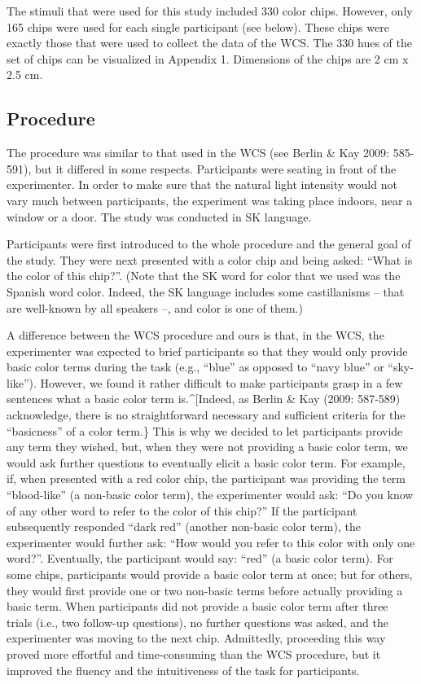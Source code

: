 \documentclass[man]{apa6}
\theoremstyle{definition}
\theoremstyle{definition}
\theoremstyle{definition}
\theoremstyle{remark}
\begin{document}
The stimuli that were used for this study included 330 color chips.
However, only 165 chips were used for each single participant (see
below). These chips were exactly those that were used to collect the
data of the WCS. The 330 hues of the set of chips can be visualized in
Appendix 1. Dimensions of the chips are 2 cm x 2.5 cm.

\subsection{Procedure}\label{procedure}

The procedure was similar to that used in the WCS (see Berlin \& Kay
2009: 585-591), but it differed in some respects. Participants were
seating in front of the experimenter. In order to make sure that the
natural light intensity would not vary much between participants, the
experiment was taking place indoors, near a window or a door. The study
was conducted in SK language.

Participants were first introduced to the whole procedure and the
general goal of the study. They were next presented with a color chip
and being asked: \enquote{What is the color of this chip?}. (Note that
the SK word for color that we used was the Spanish word color. Indeed,
the SK language includes some castillanisms -- that are well-known by
all speakers --, and color is one of them.)

A difference between the WCS procedure and ours is that, in the WCS, the
experimenter was expected to brief participants so that they would only
provide basic color terms during the task (e.g., \enquote{blue} as
opposed to \enquote{navy blue} or \enquote{sky-like}). However, we found
it rather difficult to make participants grasp in a few sentences what a
basic color term is.\^{}{[}Indeed, as Berlin \& Kay (2009: 587-589)
acknowledge, there is no straightforward necessary and sufficient
criteria for the \enquote{basicness} of a color term.\} This is why we
decided to let participants provide any term they wished, but, when they
were not providing a basic color term, we would ask further questions to
eventually elicit a basic color term. For example, if, when presented
with a red color chip, the participant was providing the term
\enquote{blood-like} (a non-basic color term), the experimenter would
ask: \enquote{Do you know of any other word to refer to the color of
this chip?} If the participant subsequently responded \enquote{dark red}
(another non-basic color term), the experimenter would further ask:
\enquote{How would you refer to this color with only one word?}.
Eventually, the participant would say: \enquote{red} (a basic color
term). For some chips, participants would provide a basic color term at
once; but for others, they would first provide one or two non-basic
terms before actually providing a basic term. When participants did not
provide a basic color term after three trials (i.e., two follow-up
questions), no further questions was asked, and the experimenter was
moving to the next chip. Admittedly, proceeding this way proved more
effortful and time-consuming than the WCS procedure, but it improved the
fluency and the intuitiveness of the task for participants.
\end{document}
